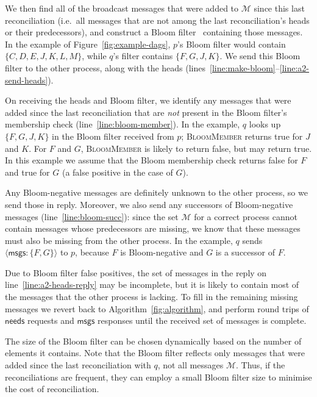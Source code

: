 \documentclass[a4paper,anonymous,USenglish]{lipics-v2019}
\begin{document}
We then find all of the broadcast messages that were added to $\mathcal{M}$ since this last reconciliation (i.e.\ all messages that are not among the last reconciliation's heads or their predecessors), and construct a Bloom filter~\cite{Bloom:1970} containing those messages.
In the example of Figure~\ref{fig:example-dags}, $p$'s Bloom filter would contain $\{C, D, E, J, K, L, M\}$, while $q$'s filter contains $\{F, G, J, K\}$.
We send this Bloom filter to the other process, along with the heads (lines~\ref{line:make-bloom}--\ref{line:a2-send-heads}).

On receiving the heads and Bloom filter, we identify any messages that were added since the last reconciliation that are \emph{not} present in the Bloom filter's membership check (line~\ref{line:bloom-member}).
In the example, $q$ looks up $\{F, G, J, K\}$ in the Bloom filter received from $p$; \textsc{BloomMember} returns true for $J$ and $K$. For $F$ and $G$, \textsc{BloomMember} is likely to return false, but may return true.
In this example we assume that the Bloom membership check returns false for $F$ and true for $G$ (a false positive in the case of $G$).

Any Bloom-negative messages are definitely unknown to the other process, so we send those in reply.
Moreover, we also send any successors of Bloom-negative messages (line~\ref{line:bloom-succ}): since the set $\mathcal{M}$ for a correct process cannot contain messages whose predecessors are missing, we know that these messages must also be missing from the other process.
In the example, $q$ sends $\langle\mathsf{msgs}: \{F, G\}\rangle$ to $p$, because $F$ is Bloom-negative and $G$ is a successor of $F$.

Due to Bloom filter false positives, the set of messages in the reply on line~\ref{line:a2-heads-reply} may be incomplete, but it is likely to contain most of the messages that the other process is lacking.
To fill in the remaining missing messages we revert back to Algorithm~\ref{fig:algorithm}, and perform round trips of $\mathsf{needs}$ requests and $\mathsf{msgs}$ responses until the received set of messages is complete.

The size of the Bloom filter can be chosen dynamically based on the number of elements it contains.
Note that the Bloom filter reflects only messages that were added since the last reconciliation with $q$, not all messages $\mathcal{M}$.
Thus, if the reconciliations are frequent, they can employ a small Bloom filter size to minimise the cost of reconciliation.
\end{document}
